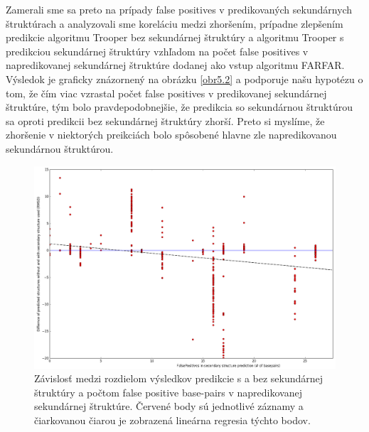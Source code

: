 \indent Zamerali sme sa preto na prípady false positives v predikovaných sekundárnych štruktúrach a analyzovali sme koreláciu medzi zhoršením, prípadne zlepšením predikcie algoritmu Trooper bez sekundárnej štruktúry a algoritmu Trooper s predikciou sekundárnej štruktúry vzhľadom na počet false positives v napredikovanej sekundárnej štruktúre dodanej ako vstup algoritmu FARFAR. Výsledok je graficky znázornený na obrázku \autoref{obr5.2} a podporuje našu hypotézu o tom, že čím viac vzrastal počet false positives v predikovanej sekundárnej štruktúre, tým bolo pravdepodobnejšie, že predikcia so sekundárnou štruktúrou sa oproti predikcii bez sekundárnej štruktúry zhorší. Preto si myslíme, že zhoršenie v niektorých preikciách bolo spôsobené hlavne zle napredikovanou sekundárnou štruktúrou.
\begin{figure}%
\includegraphics[width=\textwidth]{../img/corelation}
\caption{Závislosť medzi rozdielom výsledkov predikcie s a bez sekundárnej štruktúry a počtom false positive base-pairs v napredikovanej sekundárnej štruktúre. Červené body sú jednotlivé záznamy a čiarkovanou čiarou je zobrazená lineárna regresia týchto bodov.}
\label{obr5.2}
\end{figure}